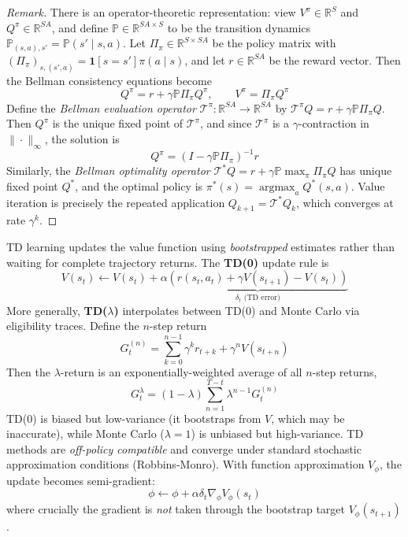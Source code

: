 \documentclass[11pt, letterpaper]{article}
\DeclareMathOperator*{\argmax}{argmax}
\newenvironment{remark}
    {\renewcommand\qedsymbol{\(\blacksquare\)}\begin{proof}[Remark]}
    {\end{proof}}
\begin{document}
\begin{remark}
    There is an operator-theoretic representation: view \(V^\pi \in \mathbb{R}^S\) and \(Q^\pi \in \mathbb{R}^{SA}\), and define \(\mathbb{P} \in \mathbb{R}^{SA \times S}\) to be the transition dynamics \(\mathbb{P}_{(s,a), s'} = \mathbb{P}(s' \mid s, a)\). Let \(\Pi_\pi \in \mathbb{R}^{S \times SA}\) be the policy matrix with \((\Pi_\pi)_{s,(s',a)} = \mathbf{1}[s = s'] \pi(a \mid s)\), and let \(r \in \mathbb{R}^{SA}\) be the reward vector. Then the Bellman consistency equations become
    \[
        Q^\pi = r + \gamma \mathbb{P} \Pi_\pi Q^\pi, \qquad V^\pi = \Pi_\pi Q^\pi
    \]
    Define the \textit{Bellman evaluation operator} \(\mathcal{T}^\pi : \mathbb{R}^{SA} \to \mathbb{R}^{SA}\) by \(\mathcal{T}^\pi Q = r + \gamma \mathbb{P} \Pi_\pi Q\). Then \(Q^\pi\) is the unique fixed point of \(\mathcal{T}^\pi\), and since \(\mathcal{T}^\pi\) is a \(\gamma\)-contraction in \(\|\cdot\|_\infty\), the solution is
    \[
        Q^\pi = (I - \gamma \mathbb{P}\Pi_\pi)^{-1} r
    \]
    Similarly, the \textit{Bellman optimality operator} \(\mathcal{T}^* Q = r + \gamma \mathbb{P} \max_\pi \Pi_\pi Q\) has unique fixed point \(Q^*\), and the optimal policy is \(\pi^*(s) = \argmax_a Q^*(s,a)\). Value iteration is precisely the repeated application \(Q_{k+1} = \mathcal{T}^* Q_k\), which converges at rate \(\gamma^k\).
\end{remark}

\begin{concept}
    TD learning updates the value function using \textit{bootstrapped} estimates rather than waiting for complete trajectory returns. The \textbf{TD(0)} update rule is
    \[
        V(s_t) \leftarrow V(s_t) + \alpha \underbrace{\left(r(s_t, a_t) + \gamma V(s_{t+1}) - V(s_t)\right)}_{\delta_t \text{ (TD error)}}
    \]
    More generally, \textbf{TD(\(\lambda\))} interpolates between TD(0) and Monte Carlo via eligibility traces. Define the \(n\)-step return
    \[
        G_t^{(n)} = \sum_{k=0}^{n-1} \gamma^k r_{t+k} + \gamma^n V(s_{t+n})
    \]
    Then the \(\lambda\)-return is an exponentially-weighted average of all \(n\)-step returns,
    \[
        G_t^\lambda = (1 - \lambda) \sum_{n=1}^{T-t} \lambda^{n-1} G_t^{(n)}
    \]
    TD(0) is biased but low-variance (it bootstraps from \(V\), which may be inaccurate), while Monte Carlo (\(\lambda = 1\)) is unbiased but high-variance. TD methods are \textit{off-policy compatible} and converge under standard stochastic approximation conditions (Robbins-Monro). With function approximation \(V_\phi\), the update becomes semi-gradient:
    \[
        \phi \leftarrow \phi + \alpha \delta_t \nabla_\phi V_\phi(s_t)
    \]
    where crucially the gradient is \textit{not} taken through the bootstrap target \(V_\phi(s_{t+1})\).
\end{concept}
\end{document}
